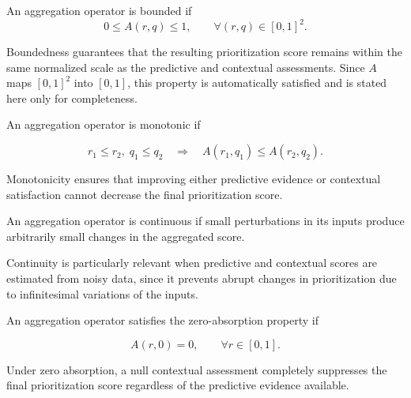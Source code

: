 \documentclass[mathematics,article,submit,moreauthors]{Definitions/mdpi}
\begin{document}
\begin{Definition}[Boundedness]
An aggregation operator is bounded if
\begin{equation}
0 \leq A(r,q) \leq 1,
\qquad \forall (r,q)\in[0,1]^2.
\end{equation}
\end{Definition}
Boundedness guarantees that the resulting prioritization score remains
within the same normalized scale as the predictive and contextual
assessments.
{\color{red}Since \(A\) maps \([0,1]^2\) into \([0,1]\), this property is automatically satisfied and is stated here only for completeness.}

\begin{Definition}[Monotonicity]
An aggregation operator is monotonic if

\begin{equation}
r_1 \leq r_2,\;
q_1 \leq q_2
\quad \Longrightarrow \quad
A(r_1,q_1)\leq A(r_2,q_2).
\end{equation}

\end{Definition}

Monotonicity ensures that improving either predictive evidence or
contextual satisfaction cannot decrease the final prioritization score.

\begin{Definition}[Continuity]
An aggregation operator is continuous if small perturbations in its
inputs produce arbitrarily small changes in the aggregated score.
\end{Definition}

Continuity is particularly relevant when predictive and contextual
scores are estimated from noisy data, since it prevents abrupt changes
in prioritization due to infinitesimal variations of the inputs.

\begin{Definition}
An aggregation operator satisfies the zero-absorption property if

\begin{equation}
A(r,0)=0,
\qquad \forall r\in[0,1].
\end{equation}

\end{Definition}

Under zero absorption, a null contextual assessment completely
suppresses the final prioritization score regardless of the predictive
evidence available.
\end{document}
